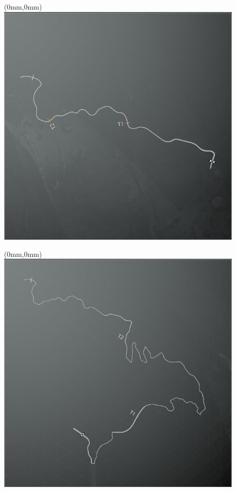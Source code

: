 \null\newpage
\begin{textblock*}{30mm}(0mm,0mm)%
\includegraphics[width=120mm]{TR/2015-05-20_00005.png}
\end{textblock*}
\null\newpage
\begin{textblock*}{30mm}(0mm,0mm)%
\includegraphics[width=120mm]{TR/2015-05-20_00002.png}
\end{textblock*}
